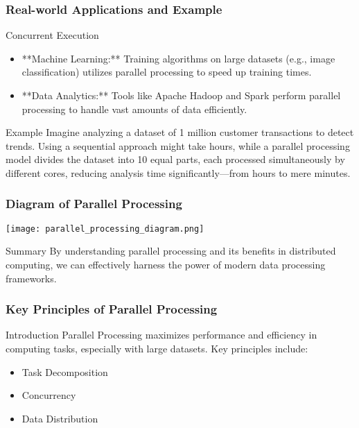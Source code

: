 \documentclass[aspectratio=169]{beamer}
\begin{document}
\begin{frame}[fragile]
    \frametitle{Real-world Applications and Example}
    \begin{block}{Concurrent Execution}
        \begin{itemize}
            \item **Machine Learning:** Training algorithms on large datasets (e.g., image classification) utilizes parallel processing to speed up training times.
            \item **Data Analytics:** Tools like Apache Hadoop and Spark perform parallel processing to handle vast amounts of data efficiently.
        \end{itemize}
    \end{block}
    \begin{block}{Example}
        Imagine analyzing a dataset of 1 million customer transactions to detect trends. Using a sequential approach might take hours, while a parallel processing model divides the dataset into 10 equal parts, each processed simultaneously by different cores, reducing analysis time significantly—from hours to mere minutes.
    \end{block}
\end{frame}

\begin{frame}[fragile]
    \frametitle{Diagram of Parallel Processing}
    \begin{center}
    \texttt{[image: parallel\_processing\_diagram.png]}
    \end{center}
    \begin{block}{Summary}
        By understanding parallel processing and its benefits in distributed computing, we can effectively harness the power of modern data processing frameworks.
    \end{block}
\end{frame}

\begin{frame}[fragile]
    \frametitle{Key Principles of Parallel Processing}
    \begin{block}{Introduction}
        Parallel Processing maximizes performance and efficiency in computing tasks, especially with large datasets. 
        Key principles include:
        \begin{itemize}
            \item Task Decomposition
            \item Concurrency
            \item Data Distribution
        \end{itemize}
    \end{block}
\end{frame}
\end{document}
